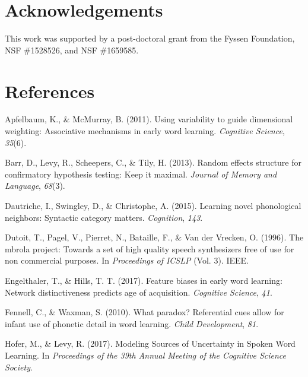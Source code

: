\documentclass[10pt, letterpaper]{article}
\begin{document}
\vspace{1em}

\section{Acknowledgements}\label{acknowledgements}

This work was supported by a post-doctoral grant from the Fyssen
Foundation, NSF \#1528526, and NSF \#1659585.

\section{References}\label{references}

\setlength{\parindent}{-0.1in} \setlength{\leftskip}{0.125in} \noindent

\hypertarget{refs}{}
\hypertarget{ref-apfelbaum2011}{}
Apfelbaum, K., \& McMurray, B. (2011). Using variability to guide
dimensional weighting: Associative mechanisms in early word learning.
\emph{Cognitive Science}, \emph{35}(6).

\hypertarget{ref-barr2013}{}
Barr, D., Levy, R., Scheepers, C., \& Tily, H. (2013). Random effects
structure for confirmatory hypothesis testing: Keep it maximal.
\emph{Journal of Memory and Language}, \emph{68}(3).

\hypertarget{ref-dautriche2015}{}
Dautriche, I., Swingley, D., \& Christophe, A. (2015). Learning novel
phonological neighbors: Syntactic category matters. \emph{Cognition},
\emph{143}.

\hypertarget{ref-dutoit1996}{}
Dutoit, T., Pagel, V., Pierret, N., Bataille, F., \& Van der Vrecken, O.
(1996). The mbrola project: Towards a set of high quality speech
synthesizers free of use for non commercial purposes. In
\emph{Proceedings of ICSLP} (Vol. 3). IEEE.

\hypertarget{ref-engelthaler2017}{}
Engelthaler, T., \& Hills, T. T. (2017). Feature biases in early word
learning: Network distinctiveness predicts age of acquisition.
\emph{Cognitive Science}, \emph{41}.

\hypertarget{ref-fennell2010}{}
Fennell, C., \& Waxman, S. (2010). What paradox? Referential cues allow
for infant use of phonetic detail in word learning. \emph{Child
Development}, \emph{81}.

\hypertarget{ref-hofer2017}{}
Hofer, M., \& Levy, R. (2017). Modeling Sources of Uncertainty in Spoken
Word Learning. In \emph{Proceedings of the 39th Annual Meeting of the
Cognitive Science Society}.
\end{document}
